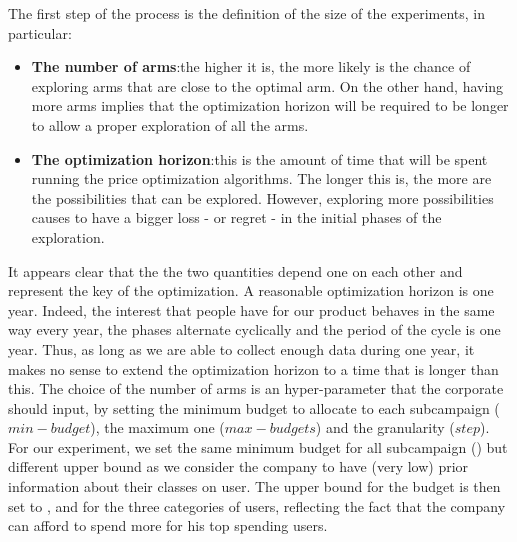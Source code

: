 The first step of the process is the definition of the size of the experiments, in particular:
\begin{itemize}
	\item \textbf{The number of arms}:\@  the higher it is, the more likely is the chance of exploring
	arms that are close to the optimal arm. On the other hand, having more arms
	implies that the optimization horizon will be required to be longer to allow a
	proper exploration of all the arms.
	\item \textbf{The optimization horizon}:\@  this is the amount of time that will be spent
	running the price optimization algorithms. The longer this is, the more are
	the possibilities that can be explored. However, exploring more possibilities
	causes to have a bigger loss - or regret - in the initial phases of the exploration.
\end{itemize} 
It appears clear that the the two quantities depend one on each other
and represent the key of the optimization. A reasonable optimization horizon is
one year. Indeed, the interest that people have for our product behaves in the same way every
year, the phases alternate cyclically and the period of the cycle is one year.
Thus, as long as we are able to collect enough data during one year, it makes no
sense to extend the optimization horizon to a time that is longer than this.
The choice of the number of arms is an hyper-parameter that the corporate should input, by setting the minimum budget to allocate to each subcampaign ($min-budget$), the maximum one ($max-budgets$) and the granularity ($step$).
\\For our experiment, we set the same minimum budget for all subcampaign () but different upper bound as we consider the company to have (very low) prior information about their classes on user. The upper bound for the budget is then set to ,  and  for the three categories of users, reflecting the fact that the company can afford to spend more for his top spending users.